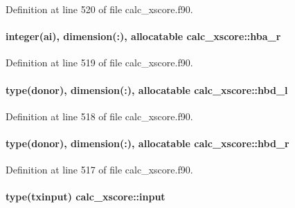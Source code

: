 Definition at line 520 of file calc\-\_\-xscore.\-f90.

\hypertarget{classcalc__xscore_a3c3633756176c30b563ff354b54a3e04}{
\paragraph[{hba\-\_\-r}]{\setlength{\rightskip}{0pt plus 5cm}integer(ai), dimension(\-:), allocatable calc\-\_\-xscore\-::hba\-\_\-r}}\label{classcalc__xscore_a3c3633756176c30b563ff354b54a3e04}


Definition at line 519 of file calc\-\_\-xscore.\-f90.

\hypertarget{classcalc__xscore_a9018215ff9ce2915690c96b249fb84f4}{
\paragraph[{hbd\-\_\-l}]{\setlength{\rightskip}{0pt plus 5cm}type({\bf donor}), dimension(\-:), allocatable calc\-\_\-xscore\-::hbd\-\_\-l}}\label{classcalc__xscore_a9018215ff9ce2915690c96b249fb84f4}


Definition at line 518 of file calc\-\_\-xscore.\-f90.

\hypertarget{classcalc__xscore_a3e2ad3dad04d694936a330ec41ec9c26}{
\paragraph[{hbd\-\_\-r}]{\setlength{\rightskip}{0pt plus 5cm}type({\bf donor}), dimension(\-:), allocatable calc\-\_\-xscore\-::hbd\-\_\-r}}\label{classcalc__xscore_a3e2ad3dad04d694936a330ec41ec9c26}


Definition at line 517 of file calc\-\_\-xscore.\-f90.

\hypertarget{classcalc__xscore_a8bb1f4602ad30ce8f3059e0521c08824}{
\paragraph[{input}]{\setlength{\rightskip}{0pt plus 5cm}type({\bf txinput}) calc\-\_\-xscore\-::input}}\label{classcalc__xscore_a8bb1f4602ad30ce8f3059e0521c08824}


